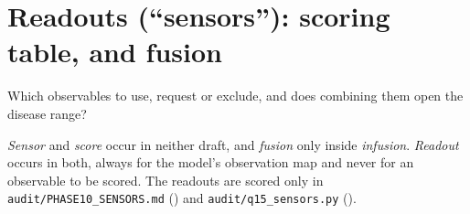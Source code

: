 \section{Readouts (``sensors''): scoring table, and fusion}

\Q Which observables to use, request or exclude, and does combining them open the disease
range?

\D \emph{Sensor} and \emph{score} occur in neither draft, and \emph{fusion} only inside
\emph{infusion}. \emph{Readout} occurs in both, always for the model's observation map and
never for an observable to be scored. The readouts are scored only in
\texttt{audit/PHASE10\_SENSORS.md} () and
\texttt{audit/q15\_sensors.py} ().

